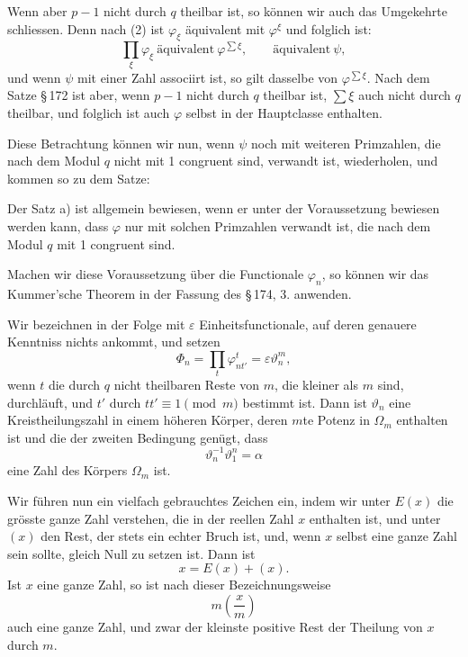\documentclass[11pt]{article}
\begin{document}
Wenn aber $p-1$ nicht durch $q$ theilbar ist, so können wir auch das Umgekehrte schliessen. Denn nach (2) ist $\varphi_\xi$ äquivalent mit $\varphi^\xi$ und folglich ist:
\[
\prod_\xi\varphi_\xi\ \text{äquivalent}\ \varphi^{\sum\xi},
\qquad
\text{äquivalent}\ \psi,
\]
und wenn $\psi$ mit einer Zahl associirt ist, so gilt dasselbe von $\varphi^{\sum\xi}$. Nach dem Satze \S\,172 ist aber, wenn $p-1$ nicht durch $q$ theilbar ist, $\sum\xi$ auch nicht durch $q$ theilbar, und folglich ist auch $\varphi$ selbst in der Hauptclasse enthalten.

Diese Betrachtung können wir nun, wenn $\psi$ noch mit weiteren Primzahlen, die nach dem Modul $q$ nicht mit 1 congruent sind, verwandt ist, wiederholen, und kommen so zu dem Satze:
\begin{center}
Der Satz a) ist allgemein bewiesen, wenn er unter der Voraussetzung bewiesen werden kann, dass $\varphi$ nur mit solchen Primzahlen verwandt ist, die nach dem Modul $q$ mit 1 congruent sind.
\end{center}

Machen wir diese Voraussetzung über die Functionale $\varphi_n$, so können wir das Kummer'sche Theorem in der Fassung des \S\,174, 3. anwenden.

Wir bezeichnen in der Folge mit $\varepsilon$ Einheitsfunctionale, auf deren genauere Kenntniss nichts ankommt, und setzen
\begin{equation}
\Phi_n=\prod_t \varphi_{nt'}^{t}=\varepsilon\vartheta_n^m,
\tag{7}
\end{equation}
wenn $t$ die durch $q$ nicht theilbaren Reste von $m$, die kleiner als $m$ sind, durchläuft, und $t'$ durch $tt'\equiv1\pmod m$ bestimmt ist. Dann ist $\vartheta_n$ eine Kreistheilungszahl in einem höheren Körper, deren $m$te Potenz in $\Omega_m$ enthalten ist und die der zweiten Bedingung genügt, dass
\begin{equation}
\vartheta_n^{-1}\vartheta_1^n=\alpha
\tag{8}
\end{equation}
eine Zahl des Körpers $\Omega_m$ ist.

Wir führen nun ein vielfach gebrauchtes Zeichen ein, indem wir unter $E(x)$ die grösste ganze Zahl verstehen, die in der reellen Zahl $x$ enthalten ist, und unter $(x)$ den Rest, der stets ein echter Bruch ist, und, wenn $x$ selbst eine ganze Zahl sein sollte, gleich Null zu setzen ist. Dann ist
\begin{equation}
x=E(x)+(x).
\tag{9}
\end{equation}
Ist $x$ eine ganze Zahl, so ist nach dieser Bezeichnungsweise
\[
m\left(\frac xm\right)
\]
auch eine ganze Zahl, und zwar der kleinste positive Rest der Theilung von $x$ durch $m$.
\end{document}
